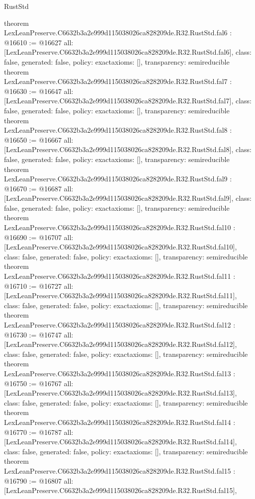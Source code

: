 \begin{lexlean}{RustStd}
\begin{coremodule}
{}
theorem LexLeanPreserve.C6632b3a2e999d115038026ca828209de.R32.RustStd.fal6 : @16610 := @16627 {
  all: [LexLeanPreserve.C6632b3a2e999d115038026ca828209de.R32.RustStd.fal6],
  class: false,
  generated: false,
  policy: exact{axioms: []},
  transparency: semireducible
}
theorem LexLeanPreserve.C6632b3a2e999d115038026ca828209de.R32.RustStd.fal7 : @16630 := @16647 {
  all: [LexLeanPreserve.C6632b3a2e999d115038026ca828209de.R32.RustStd.fal7],
  class: false,
  generated: false,
  policy: exact{axioms: []},
  transparency: semireducible
}
theorem LexLeanPreserve.C6632b3a2e999d115038026ca828209de.R32.RustStd.fal8 : @16650 := @16667 {
  all: [LexLeanPreserve.C6632b3a2e999d115038026ca828209de.R32.RustStd.fal8],
  class: false,
  generated: false,
  policy: exact{axioms: []},
  transparency: semireducible
}
theorem LexLeanPreserve.C6632b3a2e999d115038026ca828209de.R32.RustStd.fal9 : @16670 := @16687 {
  all: [LexLeanPreserve.C6632b3a2e999d115038026ca828209de.R32.RustStd.fal9],
  class: false,
  generated: false,
  policy: exact{axioms: []},
  transparency: semireducible
}
theorem LexLeanPreserve.C6632b3a2e999d115038026ca828209de.R32.RustStd.fal10 : @16690 := @16707 {
  all: [LexLeanPreserve.C6632b3a2e999d115038026ca828209de.R32.RustStd.fal10],
  class: false,
  generated: false,
  policy: exact{axioms: []},
  transparency: semireducible
}
theorem LexLeanPreserve.C6632b3a2e999d115038026ca828209de.R32.RustStd.fal11 : @16710 := @16727 {
  all: [LexLeanPreserve.C6632b3a2e999d115038026ca828209de.R32.RustStd.fal11],
  class: false,
  generated: false,
  policy: exact{axioms: []},
  transparency: semireducible
}
theorem LexLeanPreserve.C6632b3a2e999d115038026ca828209de.R32.RustStd.fal12 : @16730 := @16747 {
  all: [LexLeanPreserve.C6632b3a2e999d115038026ca828209de.R32.RustStd.fal12],
  class: false,
  generated: false,
  policy: exact{axioms: []},
  transparency: semireducible
}
theorem LexLeanPreserve.C6632b3a2e999d115038026ca828209de.R32.RustStd.fal13 : @16750 := @16767 {
  all: [LexLeanPreserve.C6632b3a2e999d115038026ca828209de.R32.RustStd.fal13],
  class: false,
  generated: false,
  policy: exact{axioms: []},
  transparency: semireducible
}
theorem LexLeanPreserve.C6632b3a2e999d115038026ca828209de.R32.RustStd.fal14 : @16770 := @16787 {
  all: [LexLeanPreserve.C6632b3a2e999d115038026ca828209de.R32.RustStd.fal14],
  class: false,
  generated: false,
  policy: exact{axioms: []},
  transparency: semireducible
}
theorem LexLeanPreserve.C6632b3a2e999d115038026ca828209de.R32.RustStd.fal15 : @16790 := @16807 {
  all: [LexLeanPreserve.C6632b3a2e999d115038026ca828209de.R32.RustStd.fal15],
}
\end{coremodule}
\end{lexlean}
